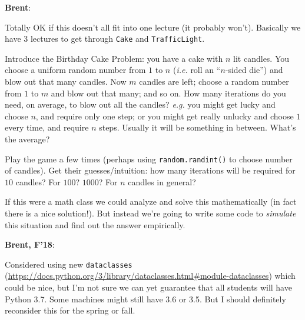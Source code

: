 \documentclass{article}
\newenvironment{reflect}[1]
{
  \noindent
  \begin{lrbox}{\reflectbox}
    \begin{minipage}[t]{\textwidth}
      \textbf{#1}:
}{
    \end{minipage}
  \end{lrbox}
  \fbox{\usebox{\reflectbox}}
}
\begin{document}
\begin{reflect}{Brent}
  Totally OK if this doesn't all fit into one lecture (it probably
  won't).  Basically we have 3 lectures to get through \verb|Cake| and
  \verb|TrafficLight|.
\end{reflect}

Introduce the Birthday Cake Problem: you have a cake with $n$ lit
candles.  You choose a uniform random number from $1$ to $n$
(\emph{i.e.} roll an ``$n$-sided die'') and blow out that many
candles.  Now $m$ candles are left; choose a random number from $1$ to
$m$ and blow out that many; and so on.  How many iterations do you
need, on average, to blow out all the candles?  \emph{e.g.} you might
get lucky and choose $n$, and require only one step; or you might get
really unlucky and choose $1$ every time, and require $n$ steps.
Usually it will be something in between.  What's the average?

Play the game a few times (perhaps using \verb|random.randint()| to
choose number of candles).  Get their guesses/intuition: how many
iterations will be required for $10$ candles? For $100$? $1000$? For
$n$ candles in general?

If this were a math class we could analyze and solve this
mathematically (in fact there is a nice solution!).  But instead we're
going to write some code to \emph{simulate} this situation and find
out the answer empirically.

\begin{reflect}{Brent, F'18}
  Considered using new \verb|dataclasses|
  (\url{https://docs.python.org/3/library/dataclasses.html#module-dataclasses})
  which could be nice, but I'm not sure we can yet guarantee that all
  students will have Python 3.7.  Some machines might still have 3.6
  or 3.5.  But I should definitely reconsider this for the spring or
  fall.
\end{reflect}
\end{document}
